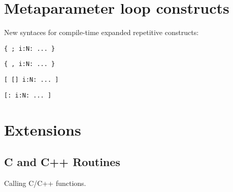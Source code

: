 \section{Metaparameter loop constructs}
\label{sec:chp:metaloop}

New syntaces for compile-time expanded repetitive constructs:

\noindent
{}

\begin{verbatim}
{ ; i:N: ... }
\end{verbatim}

\noindent
{}

\begin{verbatim}
{ , i:N: ... }
\end{verbatim}

\noindent
{}

\begin{verbatim}
[ [] i:N: ... ]
\end{verbatim}

\noindent
{}

\begin{verbatim}
[: i:N: ... ]
\end{verbatim}

\section{Extensions}
\label{sec:chp:ext}

\subsection{C and C++ Routines}
\label{sec:chp:ext:c}

Calling C/C++ functions.  

